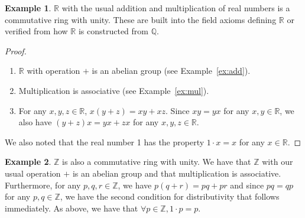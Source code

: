 \documentclass[12pt,letterpaper,DIV=11,final]{scrartcl}
\theoremstyle{plain}
\theoremstyle{definition}
\newtheorem{example}{Example}[section]
\theoremstyle{remark}
\begin{document}
\begin{example}
  $\mathbb{R}$ with the usual addition and multiplication of real numbers is a commutative ring with unity.
  These are built into the field axioms defining $\mathbb{R}$ or verified from how $\mathbb{R}$ is constructed from $\mathbb{Q}$.
  \begin{proof} \leavevmode
    \begin{enumerate}
      \item $\mathbb{R}$ with operation $+$ is an abelian group (see Example~\ref{ex:add}).
      \item Multiplication is associative (see Example~\ref{ex:mul}).
      \item For any $x, y, z \in \mathbb{R}$, $x(y + z) = xy + xz$.
        Since $xy = yx$ for any $x, y \in \mathbb{R}$, we also have $(y + z) x = yx + zx$ for any $x, y, z \in \mathbb{R}$.
    \end{enumerate}
    We also noted that the real number 1 has the property $1 \cdot x = x$ for any $x \in \mathbb{R}$.
  \end{proof}
\end{example}

\begin{example}
  $\mathbb{Z}$ is also a commutative ring with unity.
  We have that $\mathbb{Z}$ with our usual operation $+$ is an abelian group and that multiplication is associative.
  Furthermore, for any $p, q, r \in \mathbb{Z}$, we have $p (q + r) = pq + pr$ and since $pq = qp$ for any $p, q \in \mathbb{Z}$, we have the second condition for distributivity that follows immediately.
  As above, we have that $\forall p \in \mathbb{Z}, 1 \cdot p = p$.
\end{example}
\end{document}
